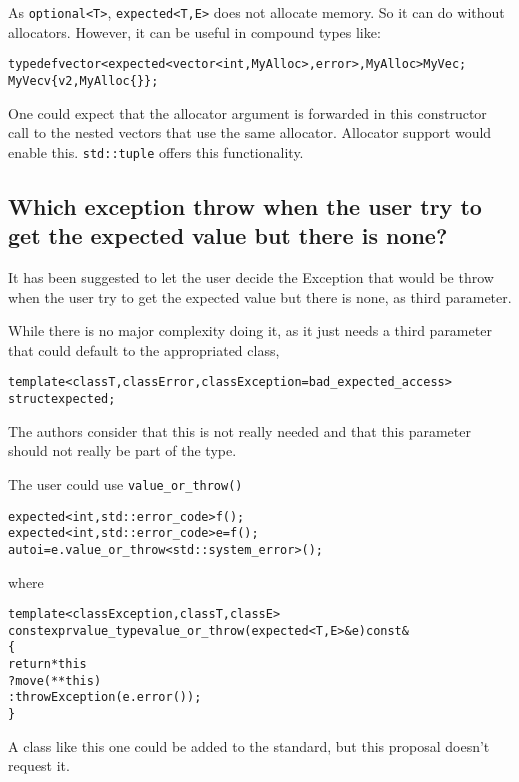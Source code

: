 \documentclass[a4paper,10pt]{article}
\newcommand{\cpp}[1]{\lstinline{#1}}
\begin{document}
As \cpp{optional<T>},  \cpp{expected<T,E>} does not allocate memory. So it can do without allocators. However, it can be useful in compound types like:

\begin{alltt}
typedef vector<expected<vector<int, MyAlloc>, error>, MyAlloc> MyVec;
MyVec v\{ v2, MyAlloc\{\} \};
\end{alltt}

\noindent
One could expect that the allocator argument is forwarded in this constructor call to the nested vectors that use the same allocator. Allocator support would enable this. \cpp{std::tuple} offers this functionality.

\subsection{Which exception throw when the user try to get the expected value but there is none?}

It has been suggested to let the user decide the Exception that would be throw when the user try to get the expected value but there is none, as third parameter. 

While there is no major complexity doing it, as it just needs a third parameter that could default to the appropriated class, 

\begin{alltt}
template <class T, class Error, class Exception = bad_expected_access>
  struct expected;
\end{alltt}

\noindent
The authors consider that this is not really needed and that this parameter should not really be part of the type.

The user could use \cpp{value_or_throw()} 

\begin{alltt}
expected<int, std::error_code> f();
expected<int, std::error_code> e = f();
auto i = e.value_or_throw<std::system_error>();  
\end{alltt}

\noindent
where 

\begin{alltt}
template <class Exception, class T, class E>
constexpr value_type value_or_throw(expected<T,E>& e) const&
\{
  return *this
    ? move(**this)
    : throw Exception(e.error());
\}
\end{alltt}

\noindent
A class like this one could be added to the standard, but this proposal doesn't request it. 
\end{document}
